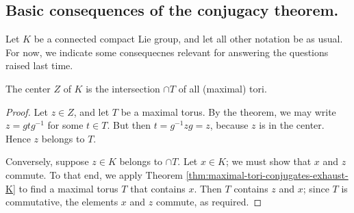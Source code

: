 \documentclass[reqno]{amsart} 
\begin{document}
\subsection{Basic consequences of the conjugacy theorem.}
\label{sec:org3dd568d}
Let $K$ be a connected compact Lie group, and let all other notation be as usual.  For now, we indicate some consequecnes relevant for answering the questions raised last time.
\begin{corollary}\label{cor:center-is-intersection-of-maxiaml-tori}
  The center $Z$ of $K$ is the intersection $\cap T$ of all (maximal) tori.
\end{corollary}
\begin{proof}
  Let $z \in Z$, and let $T$ be a maximal torus.  By the theorem, we may write $z = g t g^{-1}$ for some $t \in T$.  But then $t = g^{-1} z g = z$, because $z$ is in the center.  Hence $z$ belongs to $T$.

  Conversely, suppose $z \in K$ belongs to $\cap T$.  Let $x \in K$; we must show that $x$ and $z$ commute.  To that end, we apply Theorem \ref{thm:maximal-tori-conjugates-exhaust-K} to find a maximal torus $T$ that contains $x$.  Then $T$ contains $z$ and $x$; since $T$ is commutative, the elements $x$ and $z$ commute, as required.
\end{proof}
\end{document}
